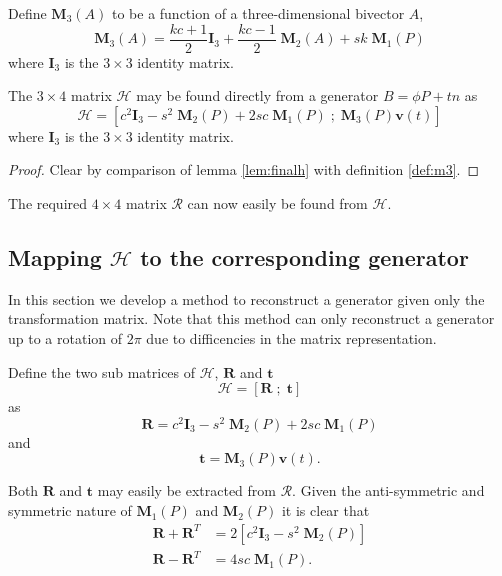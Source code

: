 \begin{definition}
\label{def:m3}
Define $\mathbf{M}_3(A)$ to be a function of a three-dimensional bivector $A$,
\[
\mathbf{M}_3(A) = \frac{kc+1}{2} \mathbf{I}_3 
+ \frac{kc-1}{2} \;\mathbf{M}_2(A) + sk\;\mathbf{M}_1(P)
\]
where  $\mathbf{I}_3$ is the $3\times3$ identity matrix.
\end{definition}

\begin{thm}
The $3\times4$ matrix $\mathcal{H}$ may be found directly from a
generator $B=\phi P + tn$ as
\[
\mathcal{H} = \left[
 c^2\mathbf{I}_3 - s^2\;\mathbf{M}_2(P) + 2sc\;\mathbf{M}_1(P) \; ; \;
 \mathbf{M}_3(P)\mathbf{v}(t)
\right]
\]
where  $\mathbf{I}_3$ is the $3\times3$ identity matrix.
\begin{proof}
Clear by comparison of lemma \ref{lem:finalh} with definition \ref{def:m3}.
\end{proof}
\end{thm}

\noindent The required $4\times4$ matrix $\mathcal{R}$ can now easily be found from $\mathcal{H}$.

\subsection{Mapping $\mathcal{H}$ to the corresponding generator}

In this section we develop a method to reconstruct a generator given only the
transformation matrix. Note that this method can only reconstruct a generator
up to a rotation of $2\pi$ due to difficencies in the matrix representation.

\begin{definition}
Define the two sub matrices of $\mathcal{H}$,
$\mathbf{R}$ and $\mathbf{t}$
\[
\mathcal{H} = [ \mathbf{R}\; ; \; \mathbf{t} ]
\]
as 
\begin{equation}
\mathbf{R} = c^2\mathbf{I}_3 - s^2\;\mathbf{M}_2(P) + 2sc\;\mathbf{M}_1(P)\label{eqn:A}
\end{equation}
and
\begin{equation}
\mathbf{t} = \mathbf{M}_3(P)\mathbf{v}(t). \label{eqn:b}
\end{equation}
\end{definition}

Both $\mathbf{R}$ and $\mathbf{t}$ may easily be extracted from $\mathcal{R}$.
Given the anti-symmetric and symmetric nature
of $\mathbf{M}_1(P)$ and $\mathbf{M}_2(P)$ it is clear that
\begin{align*}
\mathbf{R} + \mathbf{R}^T &= 
2\left[ c^2\mathbf{I}_3 - s^2\;\mathbf{M}_2(P) \right] \\
\mathbf{R} - \mathbf{R}^T &= 
4sc\;\mathbf{M}_1(P).
\end{align*} 

